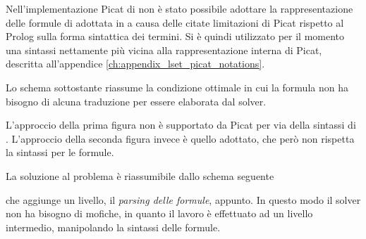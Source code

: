 \documentclass[12pt,a4paper,openright]{book} %
\begin{document}
Nell'implementazione Picat di \lset{} non è stato possibile adottare la rappresentazione delle formule di \lset{} adottata in \setlog{} a causa delle citate limitazioni di Picat rispetto al Prolog sulla forma sintattica dei termini. Si è quindi utilizzato per il momento una sintassi nettamente più vicina alla rappresentazione interna di Picat, descritta all'appendice \ref{ch:appendix_lset_picat_notations}.

Lo schema sottostante riassume la condizione ottimale in cui la formula non ha bisogno di alcuna traduzione per essere elaborata dal solver.

\begin{figure}[H]
	\centering
	\begin{minipage}[b]{0.4\textwidth}
		\centering
		\label{fig:formula_lset_solver}
	\end{minipage}%
	\begin{minipage}[b]{0.4\textwidth}
		\centering
	\end{minipage}
\end{figure}
L'approccio della prima figura non è supportato da Picat per via della sintassi di \lset{}. L'approccio della seconda figura invece è quello adottato, che però non rispetta la sintassi \lset{} per le formule.

La soluzione al problema è riassumibile dallo schema seguente
\begin{figure}[H]
\centering
{}
\end{figure}
che aggiunge un livello, il \emph{parsing delle formule}, appunto. In questo modo il solver non ha bisogno di mofiche, in quanto il lavoro è effettuato ad un livello intermedio, manipolando la sintassi delle formule.
\end{document}
